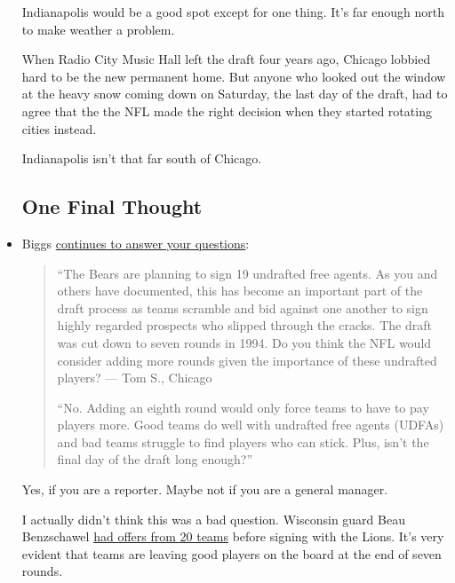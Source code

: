 \documentclass[11pt]{article}
\begin{document}
\begin{itemize}
Indianapolis would be a good spot except for one thing. It’s far enough north to make weather a problem. 

When Radio City Music Hall left the draft four years ago, Chicago lobbied hard to be the new permanent home. But anyone who looked out the window at the heavy snow coming down on Saturday, the last day of the draft, had to agree that the the NFL made the right decision when they started rotating cities instead. 

Indianapolis isn't that far south of Chicago.

\subsection*{One Final Thought}


\item Biggs \href{https://www.chicagotribune.com/sports/football/bears/ct-spt-bears-mailbag-stephen-denmark-david-montgomery-biggs-20190501-story.html}{continues to answer your questions}:

\begin{quote}
  ``The Bears are planning to sign 19 undrafted free agents. As you and others have documented, this has become an important part of the draft process as teams scramble and bid against one another to sign highly regarded prospects who slipped through the cracks. The draft was cut down to seven rounds in 1994. Do you think the NFL would consider adding more rounds given the importance of these undrafted players? — Tom S., Chicago

``No. Adding an eighth round would only force teams to have to pay players more. Good teams do well with undrafted free agents (UDFAs) and bad teams struggle to find players who can stick. Plus, isn’t the final day of the draft long enough?''
\end{quote}

Yes, if you are a reporter.  Maybe not if you are a general manager.

I actually didn't think this was a bad question.  Wisconsin guard Beau Benzschawel \href{https://twitter.com/RapSheet/status/1122584978724982784}{had offers from 20 teams} before signing with the Lions.  It's very evident that teams are leaving good players on the board at the end of seven rounds.

\end{itemize}
\end{document}
